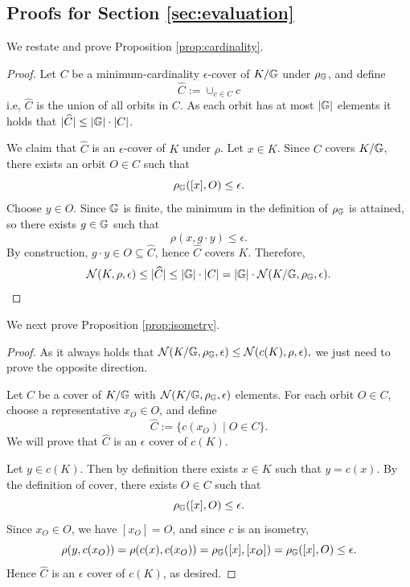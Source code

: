 \subsection{Proofs for Section \ref{sec:evaluation}}
We restate and prove Proposition \ref{prop:cardinality}.
\cardinality*
\begin{proof}
\label{upper_bound}
Let $C$ be a minimum-cardinality $\epsilon$-cover of $K/\mathbb{G}$ under $\rho_{\mathbb{G}}$, and define
\[
\widehat{C}:=\cup_{c \in C}c
\]
i.e, $\widehat{C}$ is the union of all orbits in $C$. As each orbit has at most $|\mathbb{G}|$ elements it holds that $|\widehat{C}|\le |\mathbb{G}|\cdot |C|$.

We claim that $\widehat{C}$ is an $\epsilon$-cover of $K$ under $\rho$.
Let $x\in K$. Since $C$ covers $K/\mathbb{G}$, there exists an orbit $O\in C$ such that
\[
\rho_{\mathbb{G}}([x],O)\le \epsilon.
\]
Choose $y\in O$. Since $\mathbb{G}$ is finite, the minimum in the definition of $\rho_{\mathbb{G}}$ is attained, so there exists $g\in \mathbb{G}$ such that
\[
\rho(x,g\cdot y)\le \epsilon.
\]
By construction, $g\cdot y\in O\subseteq \widehat{C}$, hence $\widehat{C}$ covers $K$.
Therefore,
\[
\mathcal{N}(K,\rho,\epsilon)
\le |\widehat{C}|
\le |\mathbb{G}|\cdot |C|
=|\mathbb{G}|\cdot \mathcal{N}(K/\mathbb{G},\rho_{\mathbb{G}},\epsilon).
\]
\end{proof}
We next prove Proposition \ref{prop:isometry}.
\isometry*
\label{Proof_isometry}
\begin{proof}
As it always holds that
\(    \mathcal{N}(K/\mathbb{G},\rho_{\mathbb{G}},\epsilon)\leq \mathcal{N}(c(K),\rho,\epsilon),
   \)
we just need to prove the opposite direction.

Let $C$ be a cover of $K/\mathbb{G}$ with $\mathcal{N}(K/\mathbb{G},\rho_{\mathbb{G}},\epsilon)$ elements. For each orbit $O\in C$, choose a representative $x_O\in O$, and define
\[
\hat{C}:=\{c(x_O)\mid O\in C\}.
\]
We will prove that $\hat{C}$ is an $\epsilon$ cover of $c(K)$.

Let $y\in c(K)$. Then by definition there exists $x\in K$ such that $y=c(x)$. By the definition of cover, there exists $O\in C$ such that
\[
\rho_{\mathbb{G}}([x],O)\leq \epsilon.
\]
Since $x_O\in O$, we have $[x_O]=O$, and since $c$ is an isometry,
\[
\rho(y,c(x_O))
=
\rho(c(x),c(x_O))
=
\rho_{\mathbb{G}}([x],[x_O])
=
\rho_{\mathbb{G}}([x],O)
\leq \epsilon.
\]
Hence $\hat{C}$ is an $\epsilon$ cover of $c(K)$, as desired.

\end{proof}


